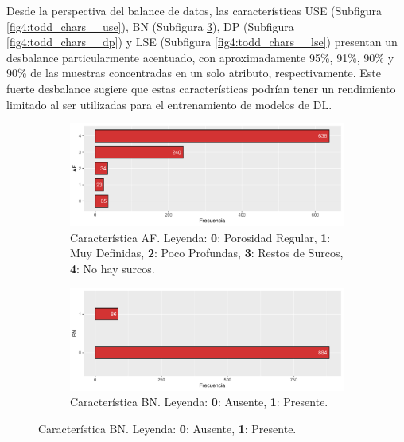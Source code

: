 Desde la perspectiva del balance de datos, las características USE (Subfigura \ref{fig4:todd_chars__use}), BN (Subfigura \ref{fig4:todd_chars__bn}), DP (Subfigura \ref{fig4:todd_chars__dp}) y LSE (Subfigura \ref{fig4:todd_chars__lse}) presentan un desbalance particularmente acentuado, con aproximadamente 95\%, 91\%, 90\% y 90\% de las muestras concentradas en un solo atributo, respectivamente. Este fuerte desbalance sugiere que estas características podrían tener un rendimiento limitado al ser utilizadas para el entrenamiento de modelos de DL.

\begin{figure}[p]
    \centering
    \begin{subfigure}{\textwidth}
        \includegraphics[width=\linewidth]{../../scripts/eda/eda_univar/char_af_distr.pdf}
        \caption{Característica AF. Leyenda: \textbf{0}: Porosidad Regular, \textbf{1}: Muy Definidas, \textbf{2}: Poco Profundas, \textbf{3}: Restos de Surcos, \textbf{4}: No hay surcos.}
        \label{fig4:todd_chars__af}
    \end{subfigure}

    \begin{subfigure}{\textwidth}
        \includegraphics[width=\linewidth]{../../scripts/eda/eda_univar/char_bn_distr.pdf}
        \caption{Característica BN. Leyenda: \textbf{0}: Ausente, \textbf{1}: Presente.}
        \label{fig4:todd_chars__bn}
    \end{subfigure}
    

\end{figure}
